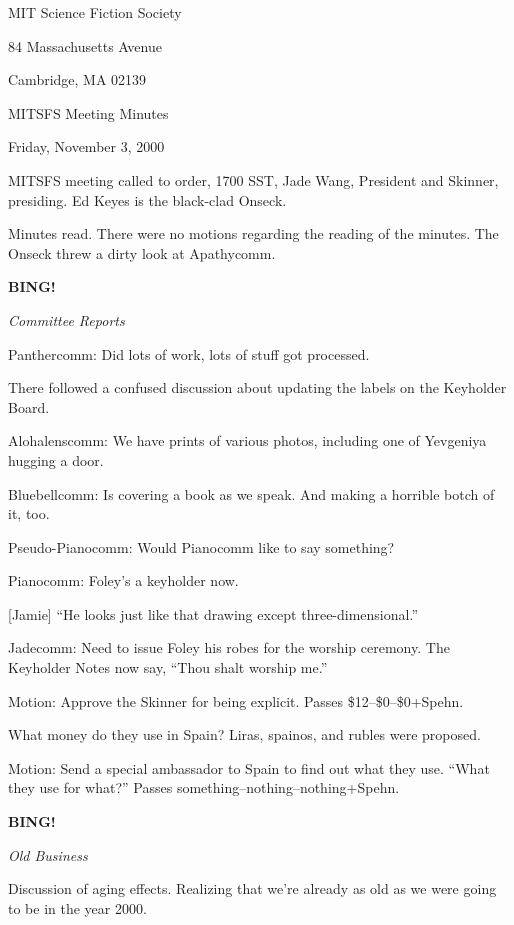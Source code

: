 \documentclass[12pt]{article}
\newcommand{\bing}{{\bf BING!} }
\newcommand{\goto}[1]{\bing \vskip 12pt \centerline{{\em{#1}}}}
\begin{document}
\begin{center}

MIT Science Fiction Society 

84 Massachusetts Avenue

Cambridge, MA 02139

\vspace{12pt}

MITSFS Meeting Minutes 

Friday, November 3, 2000

\end{center}
 
\vspace{18pt}

\setlength{\parskip}{6pt}

\noindent
MITSFS meeting called to order, 1700 SST, Jade Wang, President and
Skinner, presiding.  Ed Keyes is the black-clad Onseck.

Minutes read.  There were no motions regarding the reading of the
minutes.  The Onseck threw a dirty look at Apathycomm.

\goto{Committee Reports}

Panthercomm: Did lots of work, lots of stuff got processed.

There followed a confused discussion about updating the labels on
the Keyholder Board.

Alohalenscomm: We have prints of various photos, including one of
Yevgeniya hugging a door.

Bluebellcomm: Is covering a book as we speak.  And making a horrible
botch of it, too.

Pseudo-Pianocomm: Would Pianocomm like to say something?

Pianocomm: Foley's a keyholder now.

[Jamie] ``He looks just like that drawing except three-dimensional.''

Jadecomm: Need to issue Foley his robes for the worship ceremony.
The Keyholder Notes now say, ``Thou shalt worship me.''

Motion: Approve the Skinner for being explicit.  Passes
\$12--\$0--\$0+Spehn.

What money do they use in Spain?  Liras, spainos, and rubles were
proposed.

Motion: Send a special ambassador to Spain to find out what they
use.  ``What they use for what?''  Passes something--nothing--nothing+Spehn.

\goto{Old Business}

Discussion of aging effects.  Realizing that we're already as old as
we were going to be in the year 2000.
\end{document}
